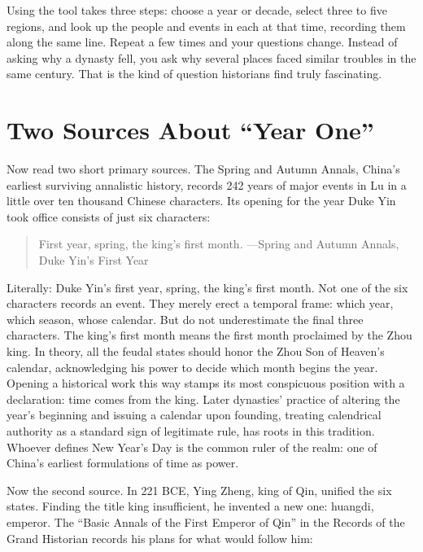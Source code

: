 Using the tool takes three steps: choose a year or decade, select three to five regions, and look up the people and events in each at that time, recording them along the same line. Repeat a few times and your questions change. Instead of asking why a dynasty fell, you ask why several places faced similar troubles in the same century. That is the kind of question historians find truly fascinating.

\section{Two Sources About ``Year One''}
Now read two short primary sources. The Spring and Autumn Annals, China's earliest surviving annalistic history, records 242 years of major events in Lu in a little over ten thousand Chinese characters. Its opening for the year Duke Yin took office consists of just six characters:

\begin{quote}
First year, spring, the king's first month. ---Spring and Autumn Annals, Duke Yin's First Year
\end{quote}
Literally: Duke Yin's first year, spring, the king's first month. Not one of the six characters records an event. They merely erect a temporal frame: which year, which season, whose calendar. But do not underestimate the final three characters. The king's first month means the first month proclaimed by the Zhou king. In theory, all the feudal states should honor the Zhou Son of Heaven's calendar, acknowledging his power to decide which month begins the year. Opening a historical work this way stamps its most conspicuous position with a declaration: time comes from the king. Later dynasties' practice of altering the year's beginning and issuing a calendar upon founding, treating calendrical authority as a standard sign of legitimate rule, has roots in this tradition. Whoever defines New Year's Day is the common ruler of the realm: one of China's earliest formulations of time as power.

Now the second source. In 221 BCE, Ying Zheng, king of Qin, unified the six states. Finding the title king insufficient, he invented a new one: huangdi, emperor. The ``Basic Annals of the First Emperor of Qin'' in the Records of the Grand Historian records his plans for what would follow him:

